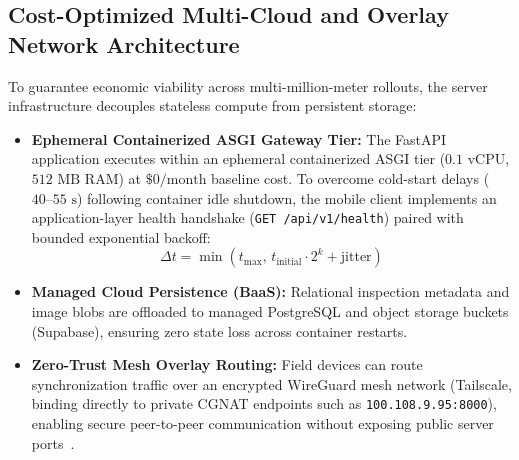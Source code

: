 \documentclass[conference]{IEEEtran}
\begin{document}
\subsection{Cost-Optimized Multi-Cloud and Overlay Network Architecture}
To guarantee economic viability across multi-million-meter rollouts, the server infrastructure decouples stateless compute from persistent storage:
\begin{itemize}
    \item \textbf{Ephemeral Containerized ASGI Gateway Tier:} The FastAPI application executes within an ephemeral containerized ASGI tier ($0.1\text{~vCPU}$, $512\text{~MB}$ RAM) at $\$0/\text{month}$ baseline cost. To overcome cold-start delays ($40\text{--}55\text{~s}$) following container idle shutdown, the mobile client implements an application-layer health handshake (\texttt{GET /api/v1/health}) paired with bounded exponential backoff:
    \begin{equation}
    \Delta t = \min\left( t_{\max}, \, t_{\text{initial}} \cdot 2^k + \text{jitter} \right)
    \label{eq:backoff}
    \end{equation}
    \item \textbf{Managed Cloud Persistence (BaaS):} Relational inspection metadata and image blobs are offloaded to managed PostgreSQL and object storage buckets (Supabase), ensuring zero state loss across container restarts.
    \item \textbf{Zero-Trust Mesh Overlay Routing:} Field devices can route synchronization traffic over an encrypted WireGuard mesh network (Tailscale, binding directly to private CGNAT endpoints such as \texttt{100.108.9.95:8000}), enabling secure peer-to-peer communication without exposing public server ports~\cite{donenfeld2017wireguard}.
\end{itemize}
\end{document}
